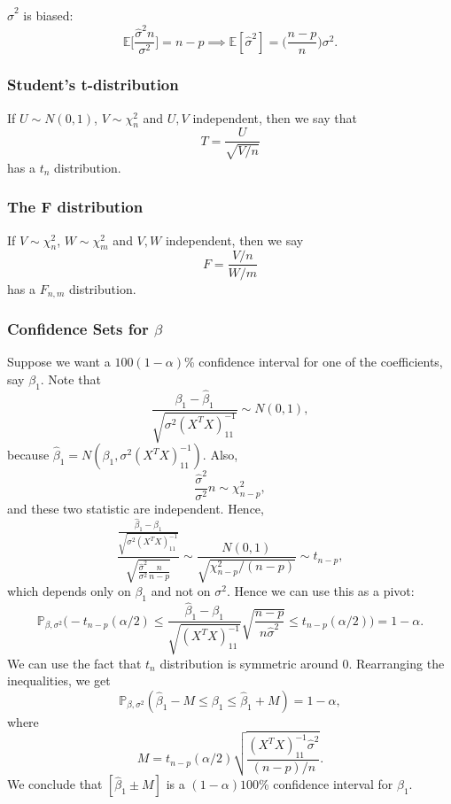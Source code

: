 \documentclass[12pt]{article}
\begin{document}
\begin{corollary}
	$\hat \sigma^2$ is biased:
	\[
	\mathbb{E}\biggl[ \frac{\hat \sigma^2 n}{\sigma^2} \biggr] = n-p \implies \mathbb{E}[\hat \sigma^2] = \biggl( \frac{n - p}{n} \biggr) \sigma^2.
	\]
\end{corollary}

\subsubsection{Student's t-distribution}
\label{subsub:students_t_distribution}

If $U \sim N(0, 1)$, $V \sim \chi^2_{n}$ and $U, V$ independent, then we say that
\[
	T = \frac{U}{\sqrt{V/n}}
\]
has a $t_n$ distribution.

\subsubsection{The F distribution}
\label{subsub:f_distribution}

If $V \sim \chi^2_{n}$, $W \sim \chi^2_{m}$ and $V, W$ independent, then we say
\[
F = \frac{V/n}{W/m}
\]
has a $F_{n,m}$ distribution.

\subsubsection{Confidence Sets for \texorpdfstring{$\beta$}{Beta}}
\label{subsub:confidence_sets_for_beta}

Suppose we want a $100(1-\alpha)$\% confidence interval for one of the coefficients, say $\beta_1$. Note that
\[
	\frac{\beta_1 - \hat \beta_1}{\sqrt{\sigma^2(X^{T}X)^{-1}_{11}}} \sim N(0, 1),
\]
because $\hat \beta_1 = N(\beta_1, \sigma^2(X^{T}X)^{-1}_{11})$. Also,
\[
\frac{\hat \sigma^2}{\sigma^2} n \sim \chi^2_{n-p},
\]
and these two statistic are independent. Hence,
\[
	\frac{\frac{\hat \beta_1 - \beta_1}{\sqrt{\sigma^2 (X^{T}X)^{-1}_{11}}}}{\sqrt{\frac{\hat \sigma^2}{\sigma^2} \frac{n}{n-p}}} \sim \frac{N(0,1)}{\sqrt{\chi^2_{n-p}/(n-p)}} \sim t_{n-p},
\]
which depends only on $\beta_1$ and not on $\sigma^2$. Hence we can use this as a pivot:
\[
\mathbb{P}_{\beta, \sigma^2} \biggl( - t_{n-p}(\alpha/2) \leq \frac{\hat \beta_1 - \beta_1}{\sqrt{(X^{T}X)^{-1}_{11}}} \sqrt{\frac{n-p}{n\hat \sigma^2}} \leq t_{n-p}(\alpha/2) \biggr) = 1 - \alpha.
\]
We can use the fact that $t_n$ distribution is symmetric around $0$. Rearranging the inequalities, we get
\[
\mathbb{P}_{\beta, \sigma^2} (\hat \beta_1 - M \leq \beta_1 \leq \hat \beta_1 + M) = 1- \alpha,
\]
where
\[
	M = t_{n-p}(\alpha/2) \sqrt{\frac{(X^{T}X)^{-1}_{11} \hat \sigma^2}{(n-p)/n}}.
\]
We conclude that $[\hat \beta_1 \pm M]$ is a $(1 - \alpha)100$\% confidence interval for $\beta_1$.
\end{document}
